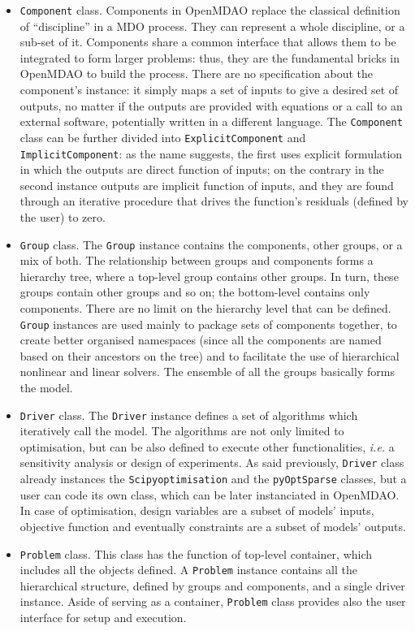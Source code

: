 \begin{itemize}
	\item \texttt{Component} class. Components in OpenMDAO replace the classical definition of ``discipline'' in a MDO process. 
	They can represent a whole discipline, or a sub-set of it.
	Components share a common interface that allows them to be integrated to form larger problems: thus, they are the fundamental bricks in OpenMDAO to build the process.
	There are no specification about the component's instance: it simply maps a set of inputs to give a desired set of outputs, no matter if the outputs are provided with equations or a call to an external software, potentially written in a different language. 
	The \texttt{Component} class can be further divided into \texttt{ExplicitComponent} and \texttt{ImplicitComponent}: as the name suggests, the first uses explicit formulation in which the outputs are direct function of inputs; on the contrary in the second instance outputs are implicit function of inputs, and they are found through an iterative procedure that drives the function's residuals (defined by the user) to zero. 
	
	\item \texttt{Group} class. The \texttt{Group} instance contains the components, other groups, or a mix of both. 
	The relationship between groups and components forms a hierarchy tree, where a top-level group contains other groups. 
	In turn, these groups contain other groups and so on; the bottom-level contains only components. 
	There are no limit on the hierarchy level that can be defined. \texttt{Group} instances are used mainly to package sets of components together, to create better organised namespaces (since all the components are named based on their ancestors on the tree) and to facilitate the use of hierarchical nonlinear and linear solvers. 
	The ensemble of all the groups basically forms the model. 
	
	\item \texttt{Driver} class. The \texttt{Driver} instance defines a set of algorithms which iteratively call the model. 
	The algorithms are not only limited to optimisation, but can be also defined to execute other functionalities, \textit{i.e.} a sensitivity analysis or design of experiments.
	As said previously, \texttt{Driver} class already instances the \texttt{Scipyoptimisation} and the \texttt{pyOptSparse} classes, but a user can code its own class, which can be later instanciated in OpenMDAO. 
	In case of optimisation, design variables are a subset of models' inputs, objective function and eventually constraints are a subset of models' outputs. 
	
	\item  \texttt{Problem} class. This class has the function of top-level container, which includes all the objects defined. A \texttt{Problem} instance contains all the hierarchical structure, defined by groups and components, and a single driver instance. Aside of serving as a container, \texttt{Problem} class provides also the user interface for setup and execution.   
\end{itemize} 

